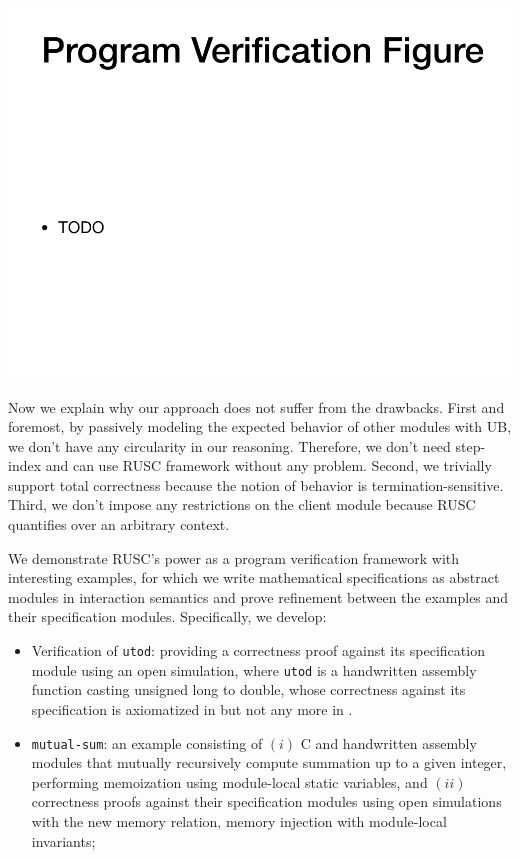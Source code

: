 \includegraphics[width=0.6\linewidth]{fig-program-verif.png}

\noindent Now we explain why our approach does not suffer from the drawbacks.
First and foremost, by passively modeling the expected behavior of other modules with UB, we don't have any circularity in our reasoning. Therefore, we don't need step-index and can use RUSC framework without any problem.
Second, we trivially support total correctness because the notion of behavior is termination-sensitive.
Third, we don't impose any restrictions on the client module because RUSC quantifies over an arbitrary context.



We demonstrate RUSC's power as a program verification framework with interesting
examples, for which we write mathematical specifications as abstract
modules in interaction semantics and prove refinement between the
examples and their specification modules.  Specifically, we develop:
\begin{itemize}
\item Verification of \texttt{utod}: providing a correctness proof
  against its specification module using an open simulation,
  where \texttt{utod} is a handwritten
  assembly function casting unsigned long to double, whose correctness
  against its specification is axiomatized in \cc{} but not any more
  in \ccm{}.
\item \texttt{mutual-sum}: an example consisting of $(i)$ C and
  handwritten assembly modules that mutually recursively compute
  summation up to a given integer, performing memoization using
  module-local static variables, and $(ii)$ correctness proofs
  against their specification modules using open simulations with the
  new memory relation, memory injection with module-local invariants;
\end{itemize}
\medskip

